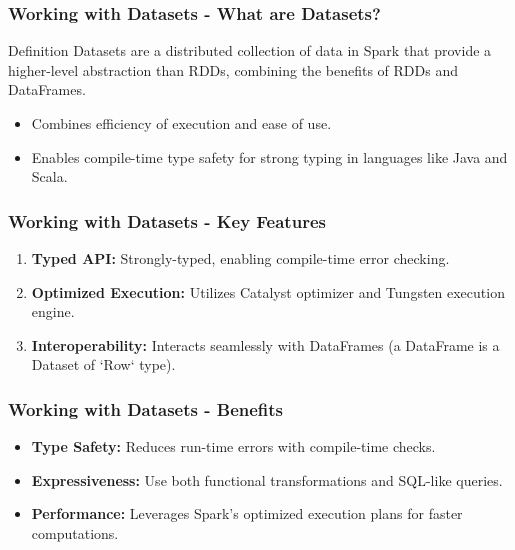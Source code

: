 \documentclass[aspectratio=169]{beamer}
\begin{document}
\begin{frame}[fragile]
    \frametitle{Working with Datasets - What are Datasets?}
    \begin{block}{Definition}
        Datasets are a distributed collection of data in Spark that provide a higher-level abstraction than RDDs, combining the benefits of RDDs and DataFrames.
    \end{block}
    \begin{itemize}
        \item Combines efficiency of execution and ease of use.
        \item Enables compile-time type safety for strong typing in languages like Java and Scala.
    \end{itemize}
\end{frame}

\begin{frame}[fragile]
    \frametitle{Working with Datasets - Key Features}
    \begin{enumerate}
        \item \textbf{Typed API:} Strongly-typed, enabling compile-time error checking.
        \item \textbf{Optimized Execution:} Utilizes Catalyst optimizer and Tungsten execution engine.
        \item \textbf{Interoperability:} Interacts seamlessly with DataFrames (a DataFrame is a Dataset of `Row` type).
    \end{enumerate}
\end{frame}

\begin{frame}[fragile]
    \frametitle{Working with Datasets - Benefits}
    \begin{itemize}
        \item \textbf{Type Safety:} Reduces run-time errors with compile-time checks.
        \item \textbf{Expressiveness:} Use both functional transformations and SQL-like queries.
        \item \textbf{Performance:} Leverages Spark's optimized execution plans for faster computations.
    \end{itemize}
\end{frame}
\end{document}
